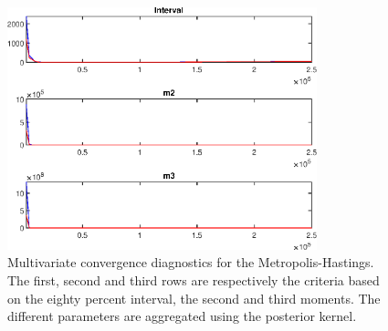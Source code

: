  
\begin{figure}[H]
\centering 
\includegraphics[width=0.8\textwidth]{BRS_est_shopping/Output/BRS_est_shopping_mdiag}
\caption{Multivariate convergence diagnostics for the Metropolis-Hastings.
The first, second and third rows are respectively the criteria based on
the eighty percent interval, the second and third moments. The different 
parameters are aggregated using the posterior kernel.}\label{Fig:MultivariateDiagnostics}
\end{figure}

